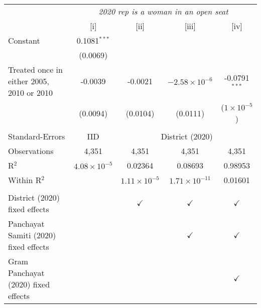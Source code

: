 
\begingroup
\centering
\begin{tabular}{lcccc}
   \toprule
    & \multicolumn{4}{c}{\textit{2020 rep is a woman in an open seat}}\\
                                             & [i]                   & [ii]                  & [iii]                  & [iv]\\  
   \midrule 
   Constant                                  & 0.1081$^{***}$        &                       &                        &   \\   
                                             & (0.0069)              &                       &                        &   \\   
   Treated once in either 2005, 2010 or 2010 & -0.0039               & -0.0021               & $-2.58\times 10^{-6}$  & -0.0791$^{***}$\\   
                                             & (0.0094)              & (0.0104)              & (0.0111)               & ($1\times 10^{-5}$)\\    
    \\
   Standard-Errors & IID & \multicolumn{3}{c}{District (2020)} \\ 
   Observations                              & 4,351                 & 4,351                 & 4,351                  & 4,351\\  
   R$^2$                                     & $4.08\times 10^{-5}$  & 0.02364               & 0.08693                & 0.98953\\  
   Within R$^2$                              &                       & $1.11\times 10^{-5}$  & $1.71\times 10^{-11}$  & 0.01601\\  
    \\
   District (2020) fixed effects             &                       & $\checkmark$          & $\checkmark$           & $\checkmark$\\   
   Panchayat Samiti (2020) fixed effects     &                       &                       & $\checkmark$           & $\checkmark$\\   
   Gram Panchayat (2020) fixed effects       &                       &                       &                        & $\checkmark$\\   
   \bottomrule
\end{tabular}
\par\endgroup



